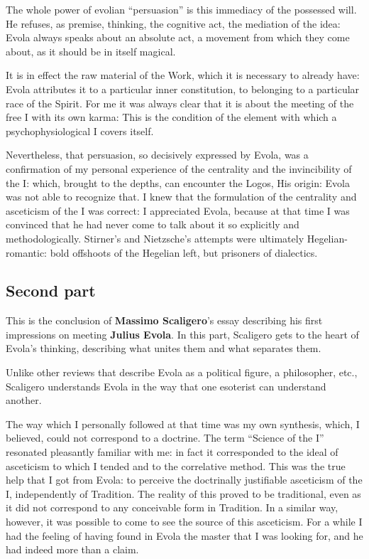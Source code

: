 The whole power of evolian ``persuasion'' is this immediacy of the possessed will. He refuses, as premise, thinking, the cognitive act, the mediation of the idea: Evola always speaks about an absolute act, a movement from which they come about, as it should be in itself magical.

It is in effect the raw material of the Work, which it is necessary to already have: Evola attributes it to a particular inner constitution, to belonging to a particular race of the Spirit. For me it was always clear that it is about the meeting of the free I with its own karma: This is the condition of the element with which a psychophysiological I covers itself.

Nevertheless, that persuasion, so decisively expressed by Evola, was a confirmation of my personal experience of the centrality and the invincibility of the I: which, brought to the depths, can encounter the Logos, His origin: Evola was not able to recognize that. I knew that the formulation of the centrality and asceticism of the I was correct: I appreciated Evola, because at that time I was convinced that he had never come to talk about it so explicitly and methodologically. Stirner's and Nietzsche's attempts were ultimately Hegelian-romantic: bold offshoots of the Hegelian left, but prisoners of dialectics.

\subsection*{Second part}

\begin{quotex}
This is the conclusion of \textbf{Massimo Scaligero}'s essay describing his first impressions on meeting \textbf{Julius Evola}. In this part, Scaligero gets to the heart of Evola's thinking, describing what unites them and what separates them.

Unlike other reviews that describe Evola as a political figure, a philosopher, etc., Scaligero understands Evola in the way that one esoterist can understand another.

\end{quotex}

The way which I personally followed at that time was my own synthesis, which, I believed, could not correspond to a doctrine. The term ``Science of the I'' resonated pleasantly familiar with me: in fact it corresponded to the ideal of asceticism to which I tended and to the correlative method. This was the true help that I got from Evola: to perceive the doctrinally justifiable asceticism of the I, independently of Tradition. The reality of this proved to be traditional, even as it did not correspond to any conceivable form in Tradition. In a similar way, however, it was possible to come to see the source of this asceticism. For a while I had the feeling of having found in Evola the master that I was looking for, and he had indeed more than a claim.

